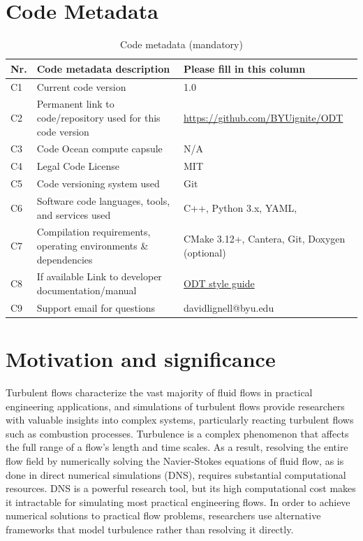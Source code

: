 \documentclass[preprint,12pt, a4paper]{elsarticle}
\begin{document}
\section*{Code Metadata}
\label{metadata}

\begin{table}[H]
\begin{tabular}{|l|p{6.5cm}|p{6.5cm}|}
\hline
\textbf{Nr.} & \textbf{Code metadata description} & \textbf{Please fill in this column} \\
\hline
C1 & Current code version & 1.0 \\
\hline
C2 & Permanent link to code/repository used for this code version & \href{https://github.com/BYUignite/ODT}{https://github.com/BYUignite/ODT} \\
\hline
C3 & Code Ocean compute capsule & N/A\\
\hline
C4 & Legal Code License   & MIT \\
\hline
C5 & Code versioning system used & Git \\
\hline
C6 & Software code languages, tools, and services used & C++, Python 3.x, YAML,  \\
\hline
C7 & Compilation requirements, operating environments \& dependencies & CMake 3.12+, Cantera, Git, Doxygen (optional) \\
\hline
C8 & If available Link to developer documentation/manual & \href{https://github.com/BYUignite/ODT}{ODT style guide} \\
\hline
C9 & Support email for questions & davidlignell@byu.edu \\
\hline
\end{tabular}
\caption{Code metadata (mandatory)}
\end{table}

\linenumbers

\section{Motivation and significance}
\label{sec:motivation}

Turbulent flows characterize the vast majority of fluid flows in practical engineering applications, and simulations of turbulent flows provide researchers with valuable insights into complex systems, particularly reacting turbulent flows such as combustion processes. Turbulence is a complex phenomenon that affects the full range of a flow's length and time scales. As a result, resolving the entire flow field by numerically solving the Navier-Stokes equations of fluid flow, as is done in direct numerical simulations (DNS), requires substantial computational resources. DNS is a powerful research tool, but its high computational cost makes it intractable for simulating most practical engineering flows. In order to achieve numerical solutions to practical flow problems, researchers use alternative frameworks that model turbulence rather than resolving it directly.
\end{document}
